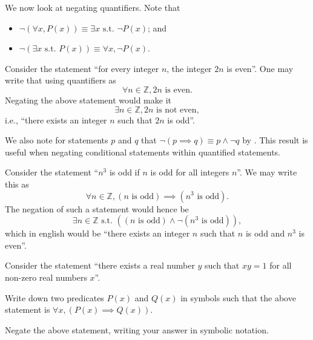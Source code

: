 We now look at negating quantifiers. Note that
\begin{itemize}
    \item $\lnot(\forall x, P(x)) \equiv \exists x \text{ s.t. } \lnot P(x)$; and
    \item $\lnot(\exists x \text{ s.t. } P(x)) \equiv \forall x, \lnot P(x)$.
\end{itemize}
\begin{example}
    Consider the statement ``for every integer $n$, the integer $2n$ is even''. One may write that using quantifiers as
    \[
        \forall n \in\mathbb{Z}, 2n \text{ is even}.
    \]
    Negating the above statement would make it
    \[
        \exists n \in \mathbb{Z}, 2n \text{ is not even},
    \]
    i.e., ``there exists an integer $n$ such that $2n$ is odd''.
\end{example}

We also note for statements $p$ and $q$ that $\lnot(p \implies q) \equiv p \land \lnot q$ by . This result is useful when negating conditional statements within quantified statements.

\begin{example}
    Consider the statement ``$n^3$ is odd if $n$ is odd for all integers $n$''. We may write this as
    \[
        \forall n \in \mathbb{Z}, (n \text{ is odd}) \implies (n^3 \text{ is odd}).
    \]
    The negation of such a statement would hence be
    \[
        \exists n \in \mathbb{Z} \text{ s.t. }((n \text{ is odd}) \land \lnot(n^3 \text{ is odd})),
    \]
    which in english would be ``there exists an integer $n$ such that $n$ is odd and $n^3$ is even''.
\end{example}

\begin{exercise}
    Consider the statement ``there exists a real number $y$ such that $xy = 1$ for all non-zero real numbers $x$''.
    \begin{partquestions}{\roman*}
        \item Write down two predicates $P(x)$ and $Q(x)$ in symbols such that the above statement is $\forall x,(P(x) \implies Q(x))$.
        \item Negate the above statement, writing your answer in symbolic notation.
    \end{partquestions}
\end{exercise}

